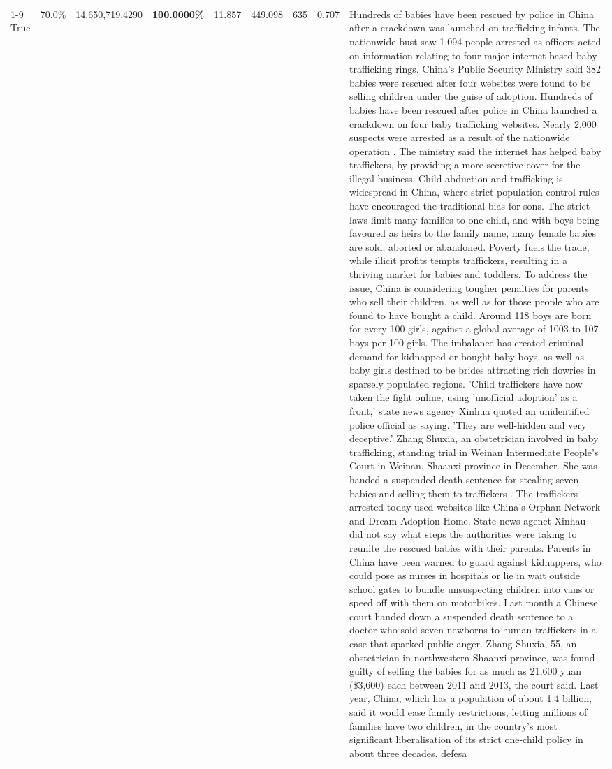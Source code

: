 \begin{table}[H]
\begin{tabular}{lllrlllll}
\cline{1-9}
True & 70.0\% & 14,650,719.4290 & \bfseries \color{red} 100.0000\% & 11.857 & 449.098 & 635 & 0.707 & Hundreds of babies have been rescued by police in China after a crackdown was launched on trafficking infants. The nationwide bust saw 1,094 people arrested as officers acted on information relating to four major internet-based baby trafficking rings. China's Public Security Ministry said 382 babies were rescued after four websites were found to be selling children under the guise of adoption. Hundreds of babies have been rescued after police in China launched a crackdown on four baby trafficking websites. Nearly 2,000 suspects were arrested as a result of the nationwide operation . The ministry said the internet has helped baby traffickers, by providing a more secretive cover for the illegal business. Child abduction and trafficking is widespread in China, where strict population control rules have encouraged the traditional bias for sons. The strict laws limit many families to one child, and with boys being favoured as heirs to the family name, many female babies are sold, aborted or abandoned. Poverty fuels the trade, while illicit profits tempts traffickers, resulting in a thriving market for babies and toddlers. To address the issue, China is considering tougher penalties for parents who sell their children, as well as for those people who are found to have bought a child. Around 118 boys are born for every 100 girls, against a global average of 1003 to 107 boys per 100 girls. The imbalance has created criminal demand for kidnapped or bought baby boys, as well as baby girls destined to be brides attracting rich dowries in sparsely populated regions. 'Child traffickers have now taken the fight online, using 'unofficial adoption' as a front,' state news agency Xinhua quoted an unidentified police official as saying. 'They are well-hidden and very deceptive.' Zhang Shuxia, an obstetrician involved in baby trafficking, standing trial in Weinan Intermediate People's Court in Weinan, Shaanxi province in December. She was handed a suspended death sentence for stealing seven babies and selling them to traffickers . The traffickers arrested today used websites like China's Orphan Network and Dream Adoption Home. State news agenct Xinhau did not say what steps the authorities were taking to reunite the rescued babies with their parents. Parents in China have been warned to guard against kidnappers, who could pose as nurses in hospitals or lie in wait outside school gates to bundle unsuspecting children into vans or speed off with them on motorbikes. Last month a Chinese court handed down a suspended death sentence to a doctor who sold seven newborns to human traffickers in a case that sparked public anger. Zhang Shuxia, 55, an obstetrician in northwestern Shaanxi province, was found guilty of selling the babies for as much as 21,600 yuan (\$3,600) each between 2011 and 2013, the court said. Last year, China, which has a population of about 1.4 billion, said it would ease family restrictions, letting millions of families have two children, in the country's most significant liberalisation of its strict one-child policy in about three decades. defesa \\

\end{tabular}
\end{table}
